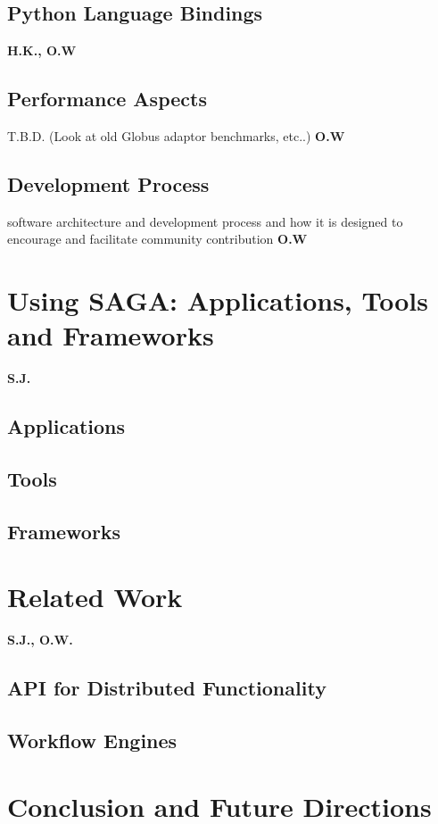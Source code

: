 \documentclass[a4paper,10pt]{article}
\begin{document}
 \subsection{Python Language Bindings}
 \textbf{H.K., O.W}
 
 
 
 
 \subsection{Performance Aspects}
 T.B.D. (Look at old Globus adaptor benchmarks, etc..) \textbf{O.W}

 \subsection{Development Process}
 software architecture and development process and how it is designed to encourage and facilitate community contribution \textbf{O.W}


\section{Using SAGA: Applications, Tools and Frameworks} \textbf{S.J.}

 \subsection{Applications}
 \subsection{Tools}
 \subsection{Frameworks}

 
\section{Related Work}
 \textbf{S.J., O.W.}

\subsection{API for Distributed Functionality}

\subsection{Workflow Engines}

\section{Conclusion and Future Directions}
\end{document}
